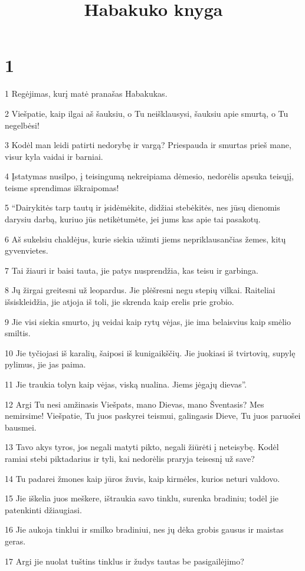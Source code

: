 

\title{Habakuko knyga}

\chapter{1}


\par 1 Regėjimas, kurį matė pranašas Habakukas. 
\par 2 Viešpatie, kaip ilgai aš šauksiu, o Tu neišklausysi, šauksiu apie smurtą, o Tu negelbėsi! 
\par 3 Kodėl man leidi patirti nedorybę ir vargą? Priespauda ir smurtas prieš mane, visur kyla vaidai ir barniai. 
\par 4 Įstatymas nusilpo, į teisingumą nekreipiama dėmesio, nedorėlis apsuka teisųjį, teisme sprendimas iškraipomas! 
\par 5 “Dairykitės tarp tautų ir įsidėmėkite, didžiai stebėkitės, nes jūsų dienomis darysiu darbą, kuriuo jūs netikėtumėte, jei jums kas apie tai pasakotų. 
\par 6 Aš sukelsiu chaldėjus, kurie siekia užimti jiems nepriklausančias žemes, kitų gyvenvietes. 
\par 7 Tai žiauri ir baisi tauta, jie patys nusprendžia, kas teisu ir garbinga. 
\par 8 Jų žirgai greitesni už leopardus. Jie plėšresni negu stepių vilkai. Raiteliai išsiskleidžia, jie atjoja iš toli, jie skrenda kaip erelis prie grobio. 
\par 9 Jie visi siekia smurto, jų veidai kaip rytų vėjas, jie ima belaisvius kaip smėlio smiltis. 
\par 10 Jie tyčiojasi iš karalių, šaiposi iš kunigaikščių. Jie juokiasi iš tvirtovių, supylę pylimus, jie jas paima. 
\par 11 Jie traukia tolyn kaip vėjas, viską nualina. Jiems jėga­jų dievas”. 
\par 12 Argi Tu nesi amžinasis Viešpats, mano Dievas, mano Šventasis? Mes nemirsime! Viešpatie, Tu juos paskyrei teismui, galingasis Dieve, Tu juos paruošei bausmei. 
\par 13 Tavo akys tyros, jos negali matyti pikto, negali žiūrėti į neteisybę. Kodėl ramiai stebi piktadarius ir tyli, kai nedorėlis praryja teisesnį už save? 
\par 14 Tu padarei žmones kaip jūros žuvis, kaip kirmėles, kurios neturi valdovo. 
\par 15 Jie iškelia juos meškere, ištraukia savo tinklu, surenka bradiniu; todėl jie patenkinti džiaugiasi. 
\par 16 Jie aukoja tinklui ir smilko bradiniui, nes jų dėka grobis gausus ir maistas geras. 
\par 17 Argi jie nuolat tuštins tinklus ir žudys tautas be pasigailėjimo?


